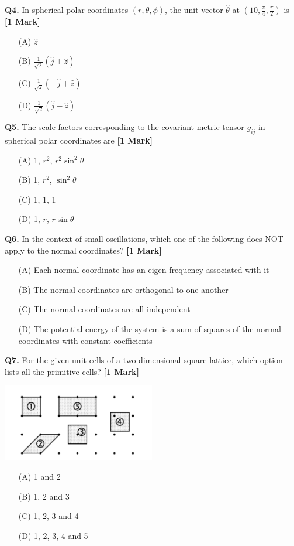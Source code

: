 \documentclass[11pt]{article}
\newcommand{\questiona}[2]{
    \noindent\textbf{Q#2.} #1 \hfill \textbf{[1 Mark]}
}
\begin{document}
\questiona{In spherical polar coordinates \((r, \theta, \phi)\), the unit vector \(\hat{\theta}\) at \((10, \frac{\pi}{4}, \frac{\pi}{2})\) is}{4}
\begin{enumerate}
    \item[(A)] \(\hat{z}\)  
    \item[(B)] \(\frac{1}{\sqrt{2}}(\hat{j} + \hat{z})\)  
    \item[(C)] \(\frac{1}{\sqrt{2}}(-\hat{j} + \hat{z})\)  
    \item[(D)] \(\frac{1}{\sqrt{2}}(\hat{j} - \hat{z})\)  
\end{enumerate}
\vspace{0.5cm}

\questiona{The scale factors corresponding to the covariant metric tensor \(g_{ij}\) in spherical polar coordinates are}{5}
\begin{enumerate}
    \item[(A)] 1, \(r^2\), \(r^2 \sin^2 \theta\)  
    \item[(B)] 1, \(r^2\), \(\sin^2 \theta\)  
    \item[(C)] 1, 1, 1  
    \item[(D)] 1, \(r\), \(r \sin \theta\)  
\end{enumerate}
\vspace{0.5cm}

\questiona{In the context of small oscillations, which one of the following does NOT apply to the normal coordinates?}{6}
\begin{enumerate}
    \item[(A)] Each normal coordinate has an eigen-frequency associated with it  
    \item[(B)] The normal coordinates are orthogonal to one another  
    \item[(C)] The normal coordinates are all independent  
    \item[(D)] The potential energy of the system is a sum of squares of the normal coordinates with constant coefficients  
\end{enumerate}
\vspace{0.5cm}

\questiona{For the given unit cells of a two-dimensional square lattice, which option lists all the primitive cells?}{7}
\begin{center}
\includegraphics[width=0.5\textwidth]{figures/7.png}
\end{center}
\begin{enumerate}
    \item[(A)] 1 and 2  
    \item[(B)] 1, 2 and 3 
    \item[(C)] 1, 2, 3 and 4 
    \item[(D)] 1, 2, 3, 4 and 5  
\end{enumerate}
\vspace{0.5cm}
\end{document}
